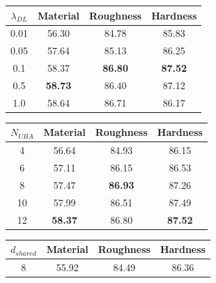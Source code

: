 \documentclass[letterpaper]{article} %
\theoremstyle{definition}                %
\theoremstyle{plain}                     %
\theoremstyle{remark}                    %
\begin{document}
\begin{table}[ht]
\centering
\vspace{-0.1cm}
\begin{minipage}[t]{0.32\textwidth}
  \centering
  \setlength{\tabcolsep}{0.7mm}
  \begin{tabular}{@{}c|ccc@{}}
  \toprule[1.2pt]
  $\lambda_{DL}$ & Material           & Roughness          & Hardness             \\ \midrule
  0.01   &  56.30         &  84.78         &    85.83       \\
  0.05   &  57.64         & 85.13 &    86.25       \\
  0.1   & 58.37 & \textbf{86.80}     & \textbf{87.52} \\
  0.5   &  \textbf{58.73}         & 86.40          &    87.12      \\
  1.0   &  58.64         &    86.71       &   86.17        \\ \bottomrule[1.2pt]
  \end{tabular}%
\end{minipage}
\hfill
\begin{minipage}[t]{0.32\textwidth}
  \centering
  \setlength{\tabcolsep}{0.7mm}
  \begin{tabular}{@{}c|ccc@{}}
  \toprule[1.2pt]
  $N_{UBA}$ & Material           & Roughness          & Hardness             \\ \midrule
  4   &  56.64         &   84.93        &    86.15       \\
  6  &   57.11        &   86.15        &     86.53      \\
  8  & 57.47  & \textbf{86.93} & 87.26  \\
  10  &  57.99        &  86.51         &    87.49       \\
  12 & \textbf{58.37}          & 86.80          & \textbf{87.52}          \\ \bottomrule[1.2pt]
  \end{tabular}%
\end{minipage}
\hfill
\begin{minipage}[t]{0.32\textwidth}
  \centering
  \setlength{\tabcolsep}{0.7mm}
  \begin{tabular}{@{}c|ccc@{}}
  \toprule[1.2pt]
  $d_{shared}$ & Material  & Roughness & Hardness    \\ \midrule
  8   &   55.92        &   84.49        &  86.36         \\

\end{tabular}
\end{minipage}
\end{table}
\end{document}
